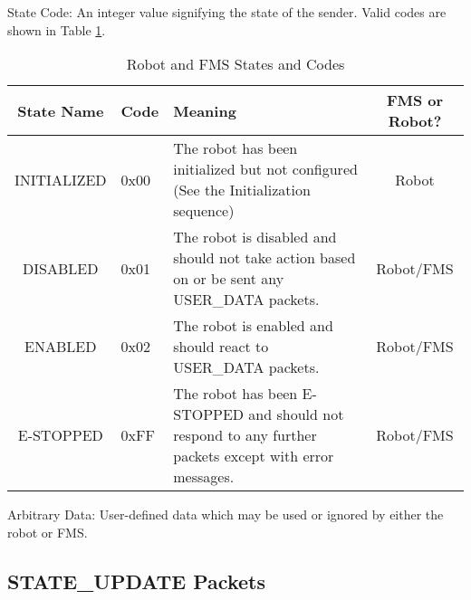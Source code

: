 \documentclass[11pt]{article}
\begin{document}
State Code: An integer value signifying the state of the sender.  Valid codes are shown in Table \ref{tab:StateCodes}.

\begin{table}[b]
    \centering
    \label{tab:StateCodes}
    \caption{Robot and FMS States and Codes}
    \begin{tabular}{|c|p{1cm}|p{3in}|c|}
        \hline
        State Name & Code & Meaning & FMS or Robot? \\
        \hline
        INITIALIZED & 0x00 & The robot has been initialized but not configured (See the Initialization sequence) & Robot \\
        \hline
        DISABLED & 0x01 & The robot is disabled and should not take action based on or be sent any USER\_DATA packets. & Robot/FMS\\
        \hline
        ENABLED & 0x02 & The robot is enabled and should react to USER\_DATA packets. & Robot/FMS \\
        \hline
        E-STOPPED & 0xFF & The robot has been E-STOPPED and should not respond to any further packets except with error messages. & Robot/FMS \\
        \hline
    \end{tabular}
\end{table}

Arbitrary Data: User-defined data which may be used or ignored by either the robot or FMS.

\subsection {STATE\_UPDATE Packets}
\end{document}
